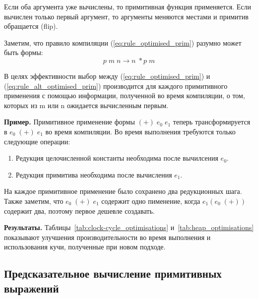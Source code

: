 \documentclass[flenqn, 14pt]{extarticle}
\begin{document}
Если оба аргумента уже вычислены, то примитивная функция применяется. Если вычислен только первый аргумент, то аргументы меняются местами и примитив обращается (flip).

Заметим, что правило компиляции (\ref{eq:rule_optimised_prim}) разумно может быть формы:
\begin{equation} \label{eq:rule_alt_optimised_prim}
p \; m \; n \rightarrow n \; *p \; m
\end{equation}

В целях эффективности выбор между (\ref{eq:rule_optimised_prim}) и (\ref{eq:rule_alt_optimised_prim}) производится для каждого примитивного применения с помощью информации, полученной во время компиляции, о том, которых из m или n ожидается вычисленным первым.

\textbf{Пример.} Примитивное применение формы $(+) \; e_0 \; e_1$ теперь трансформируется в $e_0 \; (+) \; e_1$ во время компиляции. Во время выполнения требуются только следующие операции:
\begin{enumerate}
\item Редукция целочисленной константы необходима после вычилсения $e_0$.
\item Редукция примитива необходима после вычисления $e_1$.
\end{enumerate}

На каждое примитивное применение было сохранено два редукционных шага. Также заметим, что $e_0 \; (+) \; e_1$ содержит одно пименение, когда $e_1 (e_0 \; (+))$ содержит два, поэтому первое дешевле создавать.

\textbf{Результаты.} Таблицы~\ref{tab:clock-cycle_optimisations} и~\ref{tab:heap_optimisations} показывают улучшения производительности во время выполнения и использования кучи, полученные при новом подходе.

\subsection{Предсказательное вычисление примитивных выражений}
\end{document}
